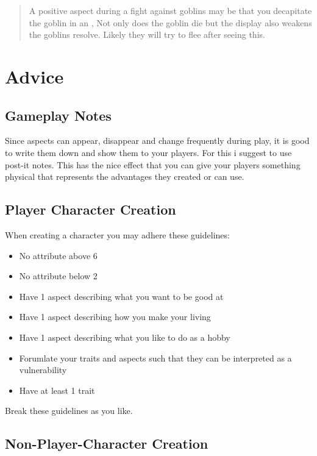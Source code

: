 \documentclass[11pt]{article}
\begin{document}
{\begin{quote}
A positive aspect during a fight against goblins may be that you decapitate the goblin in an , Not only does the goblin die but the display also weakens the goblins resolve. Likely they will try to flee after seeing this.
\end{quote}
\section{Advice}
\label{sec:org96b749d}
\subsection{Gameplay Notes}
\label{sec:org8e49864}

Since aspects can appear, disappear and change frequently during play, it is good to write them down and show them to your players. For this i suggest to use post-it notes. This has the nice effect that you can give your players something physical that represents the advantages they created or can use.
\subsection{Player Character Creation}
\label{sec:orgf393a07}

When creating a character you may adhere these guidelines:
\begin{itemize}
\item No attribute above 6
\item No attribute below 2
\item Have 1 aspect describing what you want to be good at
\item Have 1 aspect describing how you make your living
\item Have 1 aspect describing what you like to do as a hobby
\item Forumlate your traits and aspects such that they can be interpreted as a vulnerability
\item Have at least 1 trait
\end{itemize}
Break these guidelines as you like.
\subsection{Non-Player-Character Creation}
\label{sec:orgcf781be}

}
\end{document}
